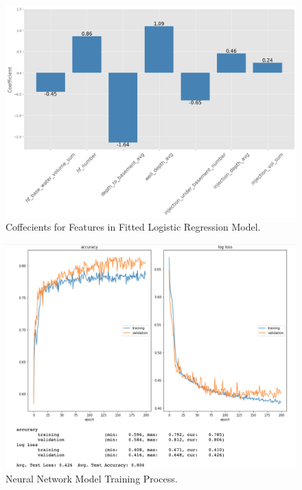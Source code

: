 \documentclass[final-report]{report-template}
\begin{document}
\begin{figure}
    \begin{center}
        \includegraphics[width=1\textwidth]{logistic_coefficients.png}
    \end{center}
    \caption{\label{fig:logistic_coffecients} Coffecients for Features in Fitted Logistic Regression Model.}
\end{figure}

\begin{figure}
    \begin{center}
        \includegraphics[width=1\textwidth]{training_process.png}
    \end{center}
    \caption{\label{fig:training_process} Neural Network Model Training Process.}
\end{figure}
\end{document}
